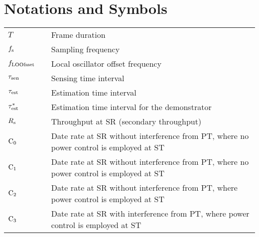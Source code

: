 
\chapter{Notations and Symbols}


\renewcommand{\arraystretch}{1.4}
\begin{longtable}{p{}p{}p{}}

       $T$                     & &             Frame duration \\
       $f_{\text{s}}$                 & &             Sampling frequency \\
       $f_{\text{LOOfsset}}$                  & & 	       Local oscillator offset frequency \\
       $\tau_{\text{sen}}$                 & &             Sensing time interval \\
       $\tau_{\text{est}}$                 & &             Estimation time interval \\      
       ${\tau}^*_{\text{est}}$               & &             Estimation time interval for the demonstrator \\      
       $R_{\text{s}}$                   & &             Throughput at SR (secondary throughput) \\
       $\text{C}_{\text{0}}$                   &  &      Date rate at SR without interference from PT, where no power control is employed at ST  \\
       $\text{C}_{\text{1}}$                   & &      Date rate at SR without interference from PT, where no power control is employed at ST \\ 
       $\text{C}_{\text{2}}$                   & &      Date rate at SR without interference from PT, where power control is employed at ST  \\
       $\text{C}_{\text{3}}$                   & &      Date rate at SR with interference from PT, where power control is employed at ST  \\ 


\end{longtable}
